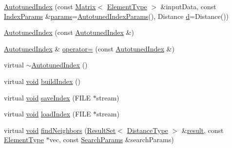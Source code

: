 \begin{DoxyCompactItemize}
\item 
\hyperlink{classcvflann_1_1AutotunedIndex_adf5ec7cdf104de8aa4ecb829fe62ccce}{Autotuned\-Index} (const \hyperlink{classcvflann_1_1Matrix}{Matrix}$<$ \hyperlink{classcvflann_1_1AutotunedIndex_a127e9c73fbe6846733e1d0e5bbab1122}{Element\-Type} $>$ \&input\-Data, const \hyperlink{namespacecvflann_a742b4c7076c21012054af74a9ee48289}{Index\-Params} \&\hyperlink{compat_8hpp_a0480a03ecc41b20cde376602531d9270}{params}=\hyperlink{structcvflann_1_1AutotunedIndexParams}{Autotuned\-Index\-Params}(), Distance \hyperlink{legacy_8hpp_a6f364afbe132c4ecfea48bde1b0618ba}{d}=Distance())
\item 
\hyperlink{classcvflann_1_1AutotunedIndex_a45866900a6193bf112f73800d14b4057}{Autotuned\-Index} (const \hyperlink{classcvflann_1_1AutotunedIndex}{Autotuned\-Index} \&)
\item 
\hyperlink{classcvflann_1_1AutotunedIndex}{Autotuned\-Index} \& \hyperlink{classcvflann_1_1AutotunedIndex_a070b15f0f5903ea73b38cb6b88267cff}{operator=} (const \hyperlink{classcvflann_1_1AutotunedIndex}{Autotuned\-Index} \&)
\item 
virtual \hyperlink{classcvflann_1_1AutotunedIndex_a6f51e0e58f135a38d6164622ae165823}{$\sim$\-Autotuned\-Index} ()
\item 
virtual \hyperlink{legacy_8hpp_a8bb47f092d473522721002c86c13b94e}{void} \hyperlink{classcvflann_1_1AutotunedIndex_adb8d4a52826b8578165dd9dfb1002f3e}{build\-Index} ()
\item 
virtual \hyperlink{legacy_8hpp_a8bb47f092d473522721002c86c13b94e}{void} \hyperlink{classcvflann_1_1AutotunedIndex_ab9552f173c22040794429231c6a13407}{save\-Index} (F\-I\-L\-E $\ast$stream)
\item 
virtual \hyperlink{legacy_8hpp_a8bb47f092d473522721002c86c13b94e}{void} \hyperlink{classcvflann_1_1AutotunedIndex_a7ca4483e58da173490a2b2cada34cafe}{load\-Index} (F\-I\-L\-E $\ast$stream)
\item 
virtual \hyperlink{legacy_8hpp_a8bb47f092d473522721002c86c13b94e}{void} \hyperlink{classcvflann_1_1AutotunedIndex_a9cbf8f750d1f0df4db4c805b96103f3c}{find\-Neighbors} (\hyperlink{classcvflann_1_1ResultSet}{Result\-Set}$<$ \hyperlink{classcvflann_1_1AutotunedIndex_af9e75c21685cbb82c25e5c3a254a9b5e}{Distance\-Type} $>$ \&\hyperlink{legacy_8hpp_a0bb77d54f6769867cfdf389897bd8e43}{result}, const \hyperlink{classcvflann_1_1AutotunedIndex_a127e9c73fbe6846733e1d0e5bbab1122}{Element\-Type} $\ast$vec, const \hyperlink{structcvflann_1_1SearchParams}{Search\-Params} \&search\-Params)

\end{DoxyCompactItemize}
